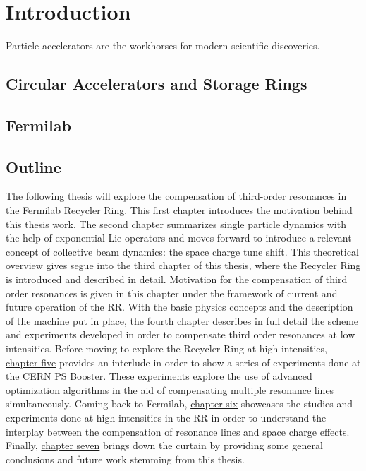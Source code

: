 \chapter{Introduction}
\label{sec:ch1}
 
Particle accelerators are the workhorses for modern scientific discoveries. 

\section{Circular Accelerators and Storage Rings}

\section{Fermilab}

\section{Outline}

The following thesis will explore the compensation of third-order resonances in the Fermilab Recycler Ring. This \hyperref[sec:ch1]{first chapter} introduces the motivation behind this thesis work. The \hyperref[sec:ch2]{second chapter} summarizes single particle dynamics with the help of exponential Lie operators and moves forward to introduce a relevant concept of collective beam dynamics: the space charge tune shift. This theoretical overview gives segue into the \hyperref[sec:ch3]{third chapter} of this thesis, where the Recycler Ring is introduced and described in detail. Motivation for the compensation of third order resonances is given in this chapter under the framework of current and future operation of the RR. With the basic physics concepts and the description of the machine put in place, the \hyperref[sec:ch4]{fourth chapter} describes in full detail the scheme and experiments developed in order to compensate third order resonances at low intensities. Before moving to explore the Recycler Ring at high intensities, \hyperref[sec:ch5]{chapter five} provides an interlude in order to show a series of experiments done at the CERN PS Booster. These experiments explore the use of advanced optimization algorithms in the aid of compensating multiple resonance lines simultaneously. Coming back to Fermilab, \hyperref[sec:ch6]{chapter six} showcases the studies and experiments done at high intensities in the RR in order to understand the interplay between the compensation of resonance lines and space charge effects. Finally, \hyperref[sec:ch7]{chapter seven} brings down the curtain by providing some general conclusions and future work stemming from this thesis.